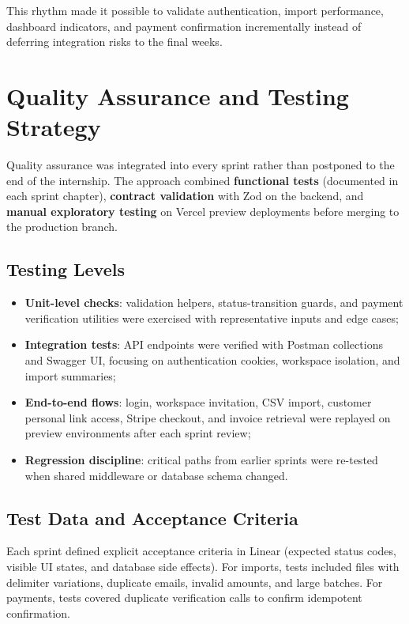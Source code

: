 \documentclass[12pt,a4paper]{report}
\begin{document}
This rhythm made it possible to validate authentication, import performance, dashboard
indicators, and payment confirmation incrementally instead of deferring integration
risks to the final weeks.

\section{Quality Assurance and Testing Strategy}
\label{sec:qa}

Quality assurance was integrated into every sprint rather than postponed to the end
of the internship.
The approach combined \textbf{functional tests} (documented in each sprint chapter),
\textbf{contract validation} with Zod on the backend, and \textbf{manual exploratory
testing} on Vercel preview deployments before merging to the production branch.

\subsection{Testing Levels}

\begin{itemize}
  \item \textbf{Unit-level checks}: validation helpers, status-transition guards, and
        payment verification utilities were exercised with representative inputs and
        edge cases;
  \item \textbf{Integration tests}: API endpoints were verified with Postman
        collections and Swagger UI, focusing on authentication cookies, workspace
        isolation, and import summaries;
  \item \textbf{End-to-end flows}: login, workspace invitation, CSV import, customer
        personal link access, Stripe checkout, and invoice retrieval were replayed on
        preview environments after each sprint review;
  \item \textbf{Regression discipline}: critical paths from earlier sprints were
        re-tested when shared middleware or database schema changed.
\end{itemize}

\subsection{Test Data and Acceptance Criteria}

Each sprint defined explicit acceptance criteria in Linear (expected status codes,
visible UI states, and database side effects).
For imports, tests included files with delimiter variations, duplicate emails, invalid
amounts, and large batches.
For payments, tests covered duplicate verification calls to confirm idempotent
confirmation.
\end{document}

